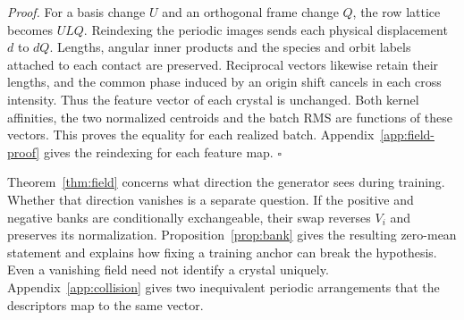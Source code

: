 \emph{Proof.} For a basis change \(U\) and an orthogonal frame change \(Q\), the row lattice becomes \(ULQ\). Reindexing the periodic images sends each physical displacement \(d\) to \(dQ\). Lengths, angular inner products and the species and orbit labels attached to each contact are preserved. Reciprocal vectors likewise retain their lengths, and the common phase induced by an origin shift cancels in each cross intensity. Thus the feature vector of each crystal is unchanged. Both kernel affinities, the two normalized centroids and the batch RMS are functions of these vectors. This proves the equality for each realized batch. Appendix~\ref{app:field-proof} gives the reindexing for each feature map. \(\square\)

Theorem~\ref{thm:field} concerns what direction the generator sees during training. Whether that direction vanishes is a separate question. If the positive and negative banks are conditionally exchangeable, their swap reverses \(V_i\) and preserves its normalization. Proposition~\ref{prop:bank} gives the resulting zero-mean statement and explains how fixing a training anchor can break the hypothesis. Even a vanishing field need not identify a crystal uniquely. Appendix~\ref{app:collision} gives two inequivalent periodic arrangements that the descriptors map to the same vector.
